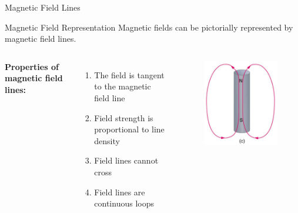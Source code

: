 \documentclass{beamer}
\begin{document}
\begin{frame}{Magnetic Field Lines}
\begin{block}{Magnetic Field Representation}
Magnetic fields can be pictorially represented by magnetic field lines.
\end{block}

\begin{columns}
\textbf{Properties of magnetic field lines:}
\begin{enumerate}
\item The field is tangent to the magnetic field line
\item Field strength is proportional to line density
\item Field lines cannot cross
\item Field lines are continuous loops
\end{enumerate}

\begin{figure}
    \centering
    \includegraphics[width=1\linewidth]{mmgmg.png}
\end{figure}
\end{columns}
\end{frame}
\end{document}
